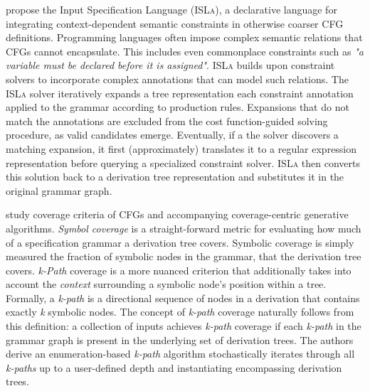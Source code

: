 \citet{steinhofel2022input} propose the Input Specification Language (\textsc{ISLa}),
a declarative language for integrating context-dependent semantic constraints
in otherwise coarser \gls{CFG} definitions.
Programming languages often impose complex semantic relations that 
\gls{CFG}s cannot encapsulate.
This includes even commonplace constraints such as \textit{"a variable must be
declared before it is assigned"}.
\textsc{ISLa} builds upon constraint solvers to incorporate complex annotations
that can model such relations. 
The \textsc{ISLa} solver iteratively expands a tree representation
each constraint annotation applied to the grammar according to production rules.
Expansions that do not match the annotations are excluded from the
cost function-guided solving procedure, as valid candidates emerge.
Eventually, if a the solver discovers a matching expansion, it first
(approximately) translates it to a regular expression representation
before querying a specialized constraint solver.
\textsc{ISLa} then converts this solution back to a 
derivation tree representation and substitutes it in the
original grammar graph.

\citet{havrikov2019systematically} study coverage criteria of \gls{CFG}s and 
accompanying coverage-centric generative algorithms.
\textit{Symbol coverage} is a straight-forward metric for evaluating
how much of a specification grammar a derivation tree covers.
Symbolic coverage is simply measured the fraction of symbolic nodes in the
grammar, that the derivation tree covers.
\textit{k-Path} coverage is a more nuanced criterion that additionally
takes into account the \textit{context} surrounding a symbolic node's
position within a tree. 
Formally, a \textit{k-path} is a directional sequence of nodes in a derivation 
that contains exactly \textit{k} symbolic nodes.
The concept of \textit{k-path} coverage naturally follows from this
definition: a collection of inputs achieves \textit{k-path} coverage if
each \textit{k-path} in the grammar graph is present in the underlying
set of derivation trees.
The authors derive an enumeration-based \textit{k-path} algorithm
stochastically iterates through all \textit{k-paths} up to a user-defined
depth and instantiating encompassing derivation trees.

